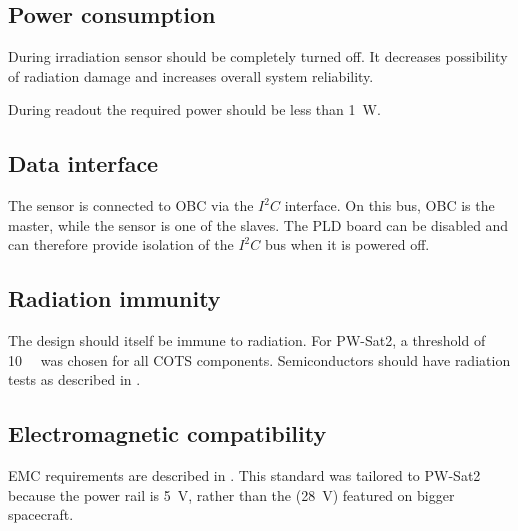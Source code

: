     \subsection{Power consumption}
        During irradiation sensor should be completely turned off. It decreases possibility of radiation damage and increases overall system reliability.

        During readout the required power should be less than \SI{1}{W}.

    \subsection{Data interface}
        The sensor is connected to OBC via the $I^2C$ interface. On this bus, OBC is the master, while the sensor is one of the slaves. The PLD board can be disabled and can therefore provide isolation of the $I^2C$ bus when it is powered off.

    \subsection{Radiation immunity}
        The design should itself be immune to radiation. For PW-Sat2, a threshold of \SI{10}{\kilo\rad} was chosen for all COTS components. Semiconductors should have radiation tests as described in \cite{ESCIES_TID_test_method}.

    \subsection{Electromagnetic compatibility}
        EMC requirements are described in \cite{ECSS_E_ST_20_07C}. This standard was tailored to PW-Sat2 because the power rail is \SI{+5}{\volt}, rather than the (\SI{+28}{\volt}) featured on bigger spacecraft.

